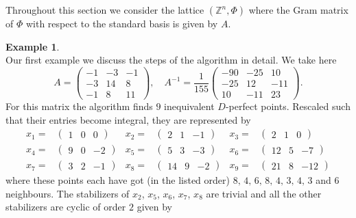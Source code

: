 \documentclass[10pt, preprint]{elsarticle}
\theoremstyle{definition}
\newtheorem{example}[theorem]{Example}
\theoremstyle{definition}
\newcommand{\Z}{\mathbb{Z}}
\begin{document}
Throughout this section we consider the lattice $(\Z^n,\Phi)$ where the Gram matrix of $\Phi$ with respect to the standard basis is given by $A$.
\begin{example}\label{exComplete}\mbox{}\\
Our first example we discuss the steps of the algorithm in detail. We take here
\[A=\begin{pmatrix}
-1 & -3 & -1 \\
-3 & 14 & 8 \\
-1 & 8 & 11
\end{pmatrix},\quad A^{-1}=\frac{1}{155}\begin{pmatrix}
-90 & -25 & 10 \\
-25 & 12 & -11 \\
10 & -11 & 23
\end{pmatrix}.
\]
For this matrix the algorithm finds $9$ inequivalent $D$-perfect points. Rescaled such that their entries become integral, they are represented by
\begin{align*}
x_1=&  \begin{pmatrix}
1 & 0 & 0
\end{pmatrix}
   & x_2= & \begin{pmatrix}
2 & 1 & -1
\end{pmatrix}
  & x_3= &  \begin{pmatrix}
2 & 1 & 0
\end{pmatrix}
 \\
x_4=&  \begin{pmatrix}
9 & 0 & -2
\end{pmatrix}
  & x_5= & \begin{pmatrix}
5 & 3 & -3
\end{pmatrix}
  & x_6= &  \begin{pmatrix}
12 & 5 & -7
\end{pmatrix}
 \\
x_7=&  \begin{pmatrix}
3 & 2 & -1
\end{pmatrix}
  & x_8= &  \begin{pmatrix}
14 & 9 & -2
\end{pmatrix}
 & x_9= &  \begin{pmatrix}
21 & 8 & -12
\end{pmatrix}
\end{align*}
where these points each have got (in the listed order) $8,\,
4,\,
6,\,
8,\,
4,\,
3,\,
4,\,
3$ and $6$ neighbours.
The stabilizers of $x_2$, $x_5$, $x_6$, $x_7$, $x_8$ are trivial and all the other stabilizers are cyclic of order $2$ given by

\end{example}
\end{document}
